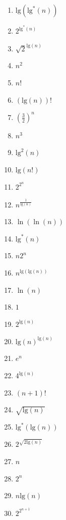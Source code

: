 \documentclass{article}
\begin{document}
\begin{enumerate}
    \def\labelenumi{\arabic{enumi}.}
    \itemsep1pt\parskip0pt
    \item $\textrm{lg}(\textrm{lg}^*(n))$
    \item $2^{\textrm{lg}^*(n)}$
    \item $\sqrt{2}^{\textrm{lg}(n)}$
    \item $n^2$
    \item $n!$
    \item $(\textrm{lg}(n))!$
    \item $(\frac{3}{2})^n$
    \item $n^3$
    \item $\textrm{lg}^2(n)$
    \item $\textrm{lg}(n!)$
    \item $2^{2^{n}}$
    \item $n^{\frac{1}{\textrm{lg}(n)}}$
    \item $\ln(\ln(n))$
    \item $\textrm{lg}^*(n)$
    \item $n 2^n$
    \item $n^{\textrm{lg}( \textrm{lg}(n))}$
    \item $\ln (n)$
    \item $1$
    \item $2^{\textrm{lg}(n)}$
    \item $\textrm{lg}(n)^{\textrm{lg}(n)}$ 
    \item $e^n$
    \item $4^{\textrm{lg}(n)}$ 
    \item $(n+1)!$
    \item $\sqrt{\textrm{lg}(n)}$
    \item $\textrm{lg}^*(\textrm{lg}(n))$
    \item $2^{\sqrt{2 \textrm{lg}(n)}}$
    \item $n$
    \item $2^n$
    \item $n\textrm{lg}(n)$ 
    \item $2^{2^{n+1}}$
\end{enumerate}
\end{document}
